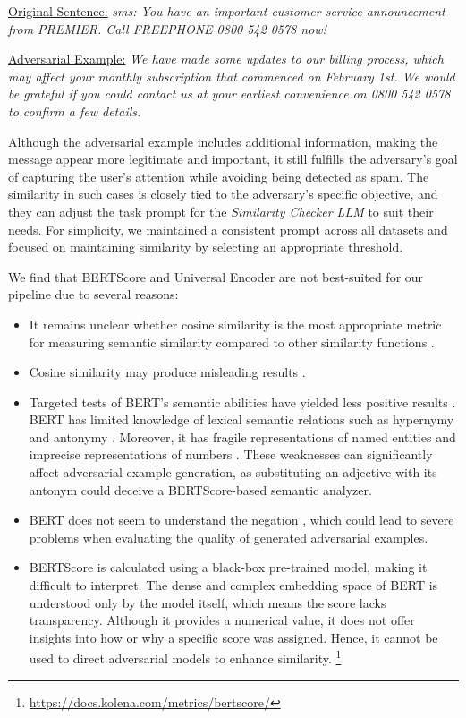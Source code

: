 \documentclass[11pt]{article}
\begin{document}
\noindent \underline{Original Sentence:} \textit{sms: You have an important customer service announcement from PREMIER. Call FREEPHONE 0800 542 0578 now!}
 
\noindent \underline{Adversarial Example:} \textit{We have made some updates to our billing process, which may affect your monthly subscription that commenced on February 1st. We would be grateful if you could contact us at your earliest convenience on 0800 542 0578 to confirm a few details.}

Although the adversarial example includes additional information, making the message appear more legitimate and important, it still fulfills the adversary’s goal of capturing the user’s attention while avoiding being detected as spam. The similarity in such cases is closely tied to the adversary's specific objective, and they can adjust the task prompt for the \textsl{Similarity Checker LLM} to suit their needs.  For simplicity, we maintained a consistent prompt across all datasets and focused on maintaining similarity by selecting an appropriate threshold.

We find that BERTScore and Universal Encoder are not best-suited for our pipeline due to several reasons:
\begin{itemize}
    \item  It remains unclear whether cosine similarity is the most appropriate metric for measuring semantic similarity compared to other similarity functions \cite{eger-etal-2019-pitfalls}.
    \item Cosine similarity may produce misleading results \cite{eger-etal-2019-pitfalls}.
    \item  Targeted tests of BERT's semantic abilities have yielded less positive results \cite{hanna-bojar-2021-fine}.  BERT has limited knowledge of lexical semantic relations such as hypernymy \cite{ravichander-etal-2020-systematicity} and antonymy \cite{staliunaite-iacobacci-2020-compositional}. Moreover, it has fragile representations of named entities \cite{balasubramanian-etal-2020-whats} and imprecise representations of numbers \cite{wallace-etal-2019-nlp}. These weaknesses can significantly affect adversarial example generation, as substituting an adjective with its antonym could deceive a BERTScore-based semantic analyzer.
    \item BERT does not seem to understand the negation \cite{10.1162/tacl_a_00298}, which could lead to severe problems when evaluating the quality of generated adversarial examples.
    \item BERTScore is calculated using a black-box pre-trained model, making it difficult to interpret. The dense and complex embedding space of BERT is understood only by the model itself, which means the score lacks transparency. Although it provides a numerical value, it does not offer insights into how or why a specific score was assigned. Hence, it cannot be used to direct adversarial models to enhance similarity. \footnote{\href{https://docs.kolena.com/metrics/bertscore/}{https://docs.kolena.com/metrics/bertscore/}}
\end{itemize}
\end{document}
